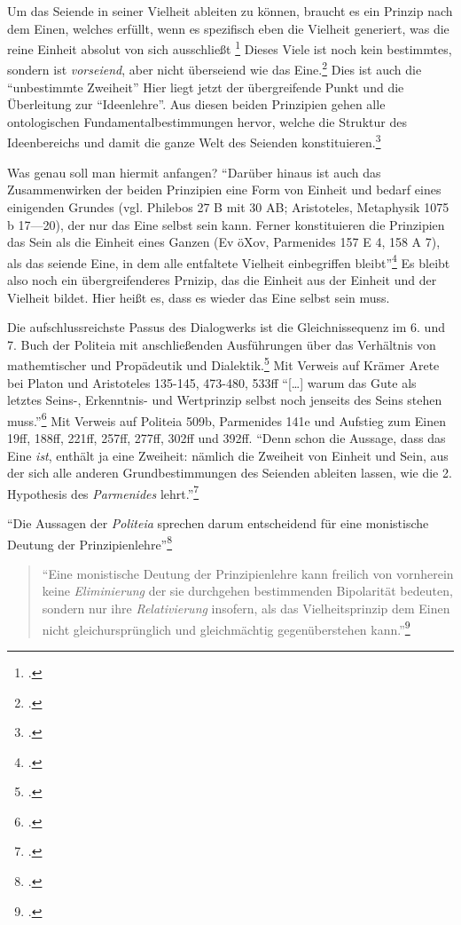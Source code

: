 \documentclass[12pt]{article}
\newcommand*{\zitatblock}[1]{%
    \begin{quote}
    \fontsize{10}{12}\selectfont
    \setlength{\parskip}{1.0em}
    #1
    \end{quote}
}
\begin{document}
Um das Seiende in seiner Vielheit ableiten zu können, braucht es ein Prinzip nach dem Einen, welches erfüllt, wenn es spezifisch eben die Vielheit generiert, was die reine Einheit absolut von sich ausschließt \footcite[vgl.][S. 103]{halfwassen2015spuren} Dieses Viele ist noch kein bestimmtes, sondern ist \emph{vorseiend}, aber nicht überseiend wie das Eine.\footcite[vgl.][S. 103]{halfwassen2015spuren} Dies ist auch die \enquote{unbestimmte Zweiheit}
Hier liegt jetzt der übergreifende Punkt und die Überleitung zur \enquote{Ideenlehre}. Aus diesen beiden Prinzipien gehen alle ontologischen Fundamentalbestimmungen hervor, welche die Struktur des Ideenbereichs und damit die ganze Welt des Seienden konstituieren.\footcite[vgl.][S. 104]{halfwassen2015spuren}

Was genau soll man hiermit anfangen? \enquote{Darüber hinaus ist auch das Zusammenwirken der beiden Prinzipien eine Form von Einheit und bedarf eines einigenden Grundes (vgl. Philebos 27 B mit 30 AB; Aristoteles, Metaphysik 1075 b 17—20), der nur das Eine selbst sein kann. Ferner konstituieren die Prinzipien das Sein als die Einheit eines Ganzen (Ev öXov, Parmenides 157 E 4, 158 A 7), als das seiende Eine, in dem alle entfaltete Vielheit einbegriffen bleibt}\footcite[][S. 106]{halfwassen2015spuren}
Es bleibt also noch ein übergreifenderes Prnizip, das die Einheit aus der Einheit und der Vielheit bildet. Hier heißt es, dass es wieder das Eine selbst sein muss.

Die aufschlussreichste Passus des Dialogwerks ist die Gleichnissequenz im 6. und 7. Buch der Politeia mit anschließenden Ausführungen über das Verhältnis von mathemtischer und Propädeutik und Dialektik.\footcite[vgl.][S. 135]{halfwassen2015spuren} Mit Verweis auf Krämer Arete bei Platon und Aristoteles 135-145, 473-480, 533ff
\enquote{[\dots] warum das Gute als letztes Seins-, Erkenntnis- und Wertprinzip selbst noch jenseits des Seins stehen muss.}\footcite[vgl.][S. 136]{halfwassen2015spuren} Mit Verweis auf Politeia 509b, Parmenides 141e und Aufstieg zum Einen 19ff, 188ff, 221ff, 257ff, 277ff, 302ff und 392ff. 
\enquote{Denn schon die Aussage, dass das Eine \emph{ist}, enthält ja eine Zweiheit: nämlich die Zweiheit von Einheit und Sein, aus der sich alle anderen Grundbestimmungen des Seienden ableiten lassen, wie die 2. Hypothesis des \emph{Parmenides} lehrt.}\footcite[][S. 136f.]{halfwassen2015spuren}

\enquote{Die Aussagen der \emph{Politeia} sprechen darum entscheidend für eine monistische Deutung der Prinzipienlehre}\footcite[][S. 137]{halfwassen2015spuren}
\zitatblock{\enquote{Eine monistische Deutung der Prinzipienlehre kann freilich von vornherein keine \emph{Eliminierung} der sie durchgehen bestimmenden Bipolarität bedeuten, sondern nur ihre \emph{Relativierung} insofern, als das Vielheitsprinzip dem Einen nicht gleichursprünglich und gleichmächtig gegenüberstehen kann.}\footcite[][S. 138]{halfwassen2015spuren}}
\end{document}
